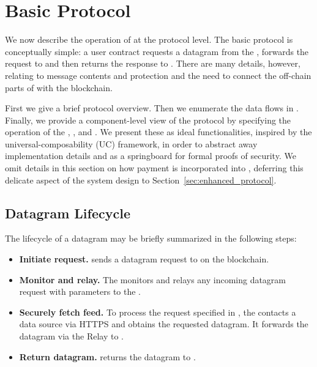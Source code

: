 

\section{Basic \tc Protocol}
\label{sec:protocols}
We now describe the operation of \tc at the protocol level. The basic protocol is conceptually simple: a user contract \reqcont requests a datagram from the \tcontract \tcont, \tcont forwards the request to \engine and then returns the response to \reqcont. There are many details, however, relating to message contents and protection and the need to connect the off-chain parts of \tc with the blockchain.

First we give a brief protocol overview. Then we enumerate the data flows in \tc. Finally, we provide a component-level view of the protocol by specifying the operation of the \tcontract, \medname, and \encname. We present these  as ideal functionalities, inspired by the universal-composability (UC) framework, in order to abstract away implementation details and as a springboard for formal proofs of security. We omit details in this section on how payment is incorporated into \tc, deferring this delicate aspect of the system design to Section~\ref{sec:enhanced_protocol}.

\subsection{Datagram Lifecycle}

The lifecycle of a datagram may be briefly summarized in the following steps:

\vspace{-1ex}
\begin{itemize}
  \setlength{\itemsep}{2pt}
  \setlength{\parskip}{0pt}
  \setlength{\parsep}{0pt}
\item {\bf Initiate request.} \reqcont sends a datagram request to \tcont on the blockchain.

\item {\bf Monitor and relay.} The \medname monitors \tcont and relays any incoming datagram request with parameters \dgform to the \encname.

\item {\bf Securely fetch feed.} To process the request specified in \dgform, the \encname contacts a data source via HTTPS and obtains the requested datagram. It forwards the datagram via the Relay to \tcont.

\item {\bf Return datagram.} \tcont returns the datagram to \reqcont.
\end{itemize}
\vspace{-1ex}

